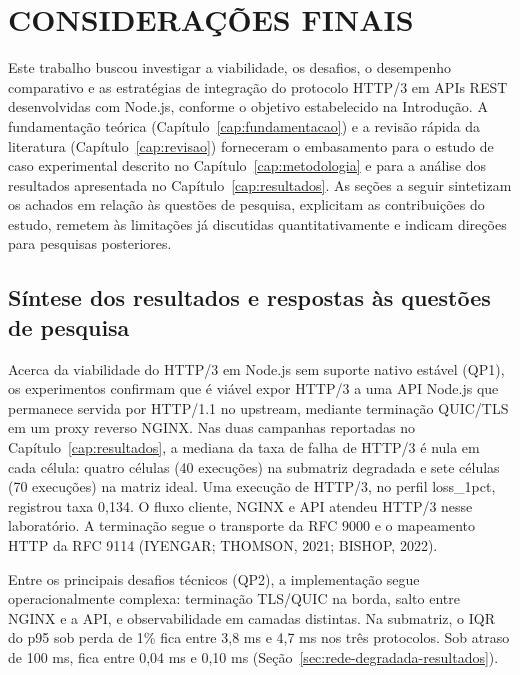 ﻿\chapter{CONSIDERAÇÕES FINAIS}\label{cap:consideracoes}

Este trabalho buscou investigar a viabilidade, os desafios, o desempenho comparativo e as estratégias de integração do protocolo HTTP/3 em APIs REST desenvolvidas com Node.js, conforme o objetivo estabelecido na Introdução. A fundamentação teórica (Capítulo~\ref{cap:fundamentacao}) e a revisão rápida da literatura (Capítulo~\ref{cap:revisao}) forneceram o embasamento para o estudo de caso experimental descrito no Capítulo~\ref{cap:metodologia} e para a análise dos resultados apresentada no Capítulo~\ref{cap:resultados}. As seções a seguir sintetizam os achados em relação às questões de pesquisa, explicitam as contribuições do estudo, remetem às limitações já discutidas quantitativamente e indicam direções para pesquisas posteriores.

\section{Síntese dos resultados e respostas às questões de pesquisa}

Acerca da viabilidade do HTTP/3 em Node.js sem suporte nativo estável (QP1), os experimentos confirmam que é viável expor HTTP/3 a uma API Node.js que permanece servida por HTTP/1.1 no upstream, mediante terminação QUIC/TLS em um proxy reverso NGINX. Nas duas campanhas reportadas no Capítulo~\ref{cap:resultados}, a mediana da taxa de falha de HTTP/3 é nula em cada célula: quatro células (40 execuções) na submatriz degradada e sete células (70 execuções) na matriz ideal. Uma execução de HTTP/3, no perfil loss\_1pct, registrou taxa 0,134. O fluxo cliente, NGINX e API atendeu HTTP/3 nesse laboratório. A terminação segue o transporte da RFC 9000 e o mapeamento HTTP da RFC 9114 (IYENGAR; THOMSON, 2021; BISHOP, 2022).

Entre os principais desafios técnicos (QP2), a implementação segue operacionalmente complexa: terminação TLS/QUIC na borda, salto entre NGINX e a API, e observabilidade em camadas distintas. Na submatriz, o IQR do p95 sob perda de 1\% fica entre 3,8 ms e 4,7 ms nos três protocolos. Sob atraso de 100 ms, fica entre 0,04 ms e 0,10 ms (Seção~\ref{sec:rede-degradada-resultados}).


